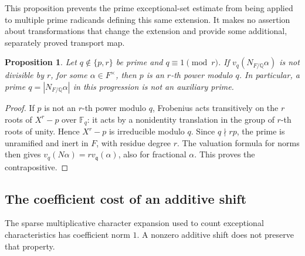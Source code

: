\documentclass[11pt]{article}
\newtheorem{proposition}[theorem]{Proposition}
\theoremstyle{definition}
\theoremstyle{remark}
\begin{document}
This proposition prevents the prime exceptional-set estimate from
being applied to multiple prime radicands defining this same extension.
It makes no assertion about transformations that change the extension
and provide some additional, separately proved transport map.

\begin{proposition}\label{prop:prime-norm-exclusion}
Let \(q\notin\{p,r\}\) be prime and \(q\equiv1\pmod r\).
If \(v_q(N_{F/\mathbb Q}\alpha)\) is not divisible by \(r\), for
some \(\alpha\in F^\times\), then \(p\) is an \(r\)-th power modulo \(q\).
In particular, a prime \(q=|N_{F/\mathbb Q}\alpha|\) in this
progression is not an auxiliary prime.
\end{proposition}
\begin{proof}
If \(p\) is not an \(r\)-th power modulo \(q\), Frobenius acts
transitively on the \(r\) roots of \(X^r-p\) over \(\mathbb F_q\):
it acts by a nonidentity translation in the group of \(r\)-th roots
of unity. Hence \(X^r-p\) is irreducible modulo \(q\).
Since \(q\nmid r p\), the prime is unramified and inert in \(F\),
with residue degree \(r\). The valuation formula for norms then gives
\(v_q(N\alpha)=r v_{\mathfrak q}(\alpha)\), also for fractional
\(\alpha\). This proves the contrapositive.
\end{proof}

\subsection{The coefficient cost of an additive shift}

The sparse multiplicative character expansion used to count exceptional
characteristics has coefficient norm \(1\). A nonzero additive shift
does not preserve that property.
\end{document}
